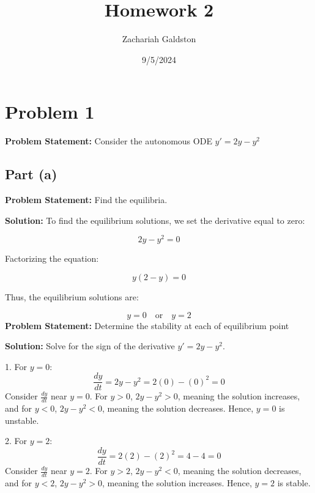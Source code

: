 \documentclass[12pt, letterpaper]{article}
\title{Homework 2}
\author{Zachariah Galdston}
\date{9/5/2024}
\begin{document}
\maketitle

\section*{Problem 1}
\textbf{Problem Statement:} Consider the autonomous ODE $y' = 2y - y^2$


\subsection*{Part (a)}
\textbf{Problem Statement:} Find the equilibria.

\textbf{Solution:} To find the equilibrium solutions, we set the derivative equal to zero:

\[
2y - y^2 = 0
\]

Factorizing the equation:

\[
y(2 - y) = 0
\]

Thus, the equilibrium solutions are:

\[
y = 0 \quad \text{or} \quad y = 2
\]
\textbf{Problem Statement:} Determine the stability at each of equilibrium point

\textbf{Solution:} Solve for the sign of the derivative \( y' = 2y - y^2 \).

1. For \( y = 0 \): 
    \[
    \frac{dy}{dt} = 2y - y^2 = 2(0) - (0)^2 = 0
    \]
    Consider \( \frac{dy}{dt} \) near \( y = 0 \). For \( y > 0 \), \( 2y - y^2 > 0 \), meaning the solution increases, and for \( y < 0 \), \( 2y - y^2 < 0 \), meaning the solution decreases. Hence, \( y = 0 \) is unstable.
\hfill \break

    2. For \( y = 2 \):
    \[
    \frac{dy}{dt} = 2(2) - (2)^2 = 4 - 4 = 0
    \]
    Consider \( \frac{dy}{dt} \) near \( y = 2 \). For \( y > 2 \), \( 2y - y^2 < 0 \), meaning the solution decreases, and for \( y < 2 \), \( 2y - y^2 > 0 \), meaning the solution increases. Hence, \( y = 2 \) is stable.
\end{document}

